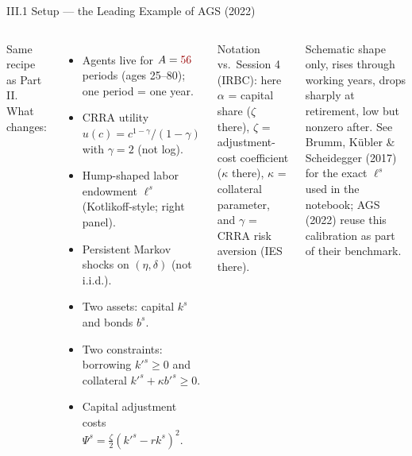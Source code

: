 \documentclass[aspectratio=169,11pt]{beamer}
\newcommand{\emphc}[1]{\textcolor{harvardcrimson}{#1}}
\begin{document}
\begin{frame}[shrink=6]{III.1 Setup --- the Leading Example of AGS (2022)}
\small
\begin{columns}[T]
\emphc{Same recipe as Part II.  What changes:}
\begin{itemize}\itemsep1pt
    \item Agents live for $A = \emphc{56}$ periods (ages 25--80); one period = one year.
    \item CRRA utility $u(c) = c^{1-\gamma}/(1-\gamma)$ with $\gamma = 2$ (\emphc{not} log).
    \item \emphc{Hump-shaped labor endowment} $\ell^s$ (Kotlikoff-style; right panel).
    \item \emphc{Persistent} Markov shocks on $(\eta,\delta)$ (not i.i.d.).
    \item \emphc{Two assets}: capital $k^s$ and bonds $b^s$.
    \item \emphc{Two constraints}: borrowing $k'^s \ge 0$ and collateral $k'^s + \kappa b'^s \ge 0$.
    \item Capital adjustment costs $\Psi^s = \tfrac{\zeta}{2}(k'^s - r k^s)^2$.
\end{itemize}

\vspace{0.2em}
{\scriptsize \emphc{Notation vs.\ Session 4 (IRBC):} here $\alpha$ = capital share ($\zeta$ there), $\zeta$ = adjustment-cost coefficient ($\kappa$ there), $\kappa$ = collateral parameter, and $\gamma$ = CRRA risk aversion (IES there).}

\centering
{}

{\scriptsize \emphc{Schematic shape only}, rises through working years, drops sharply at retirement, low but nonzero after.  See \emphc{Brumm, K\"ubler \& Scheidegger (2017)} for the exact $\ell^s$ used in the notebook; AGS (2022) reuse this calibration as part of their benchmark.}
\end{columns}
\end{frame}
\end{document}
